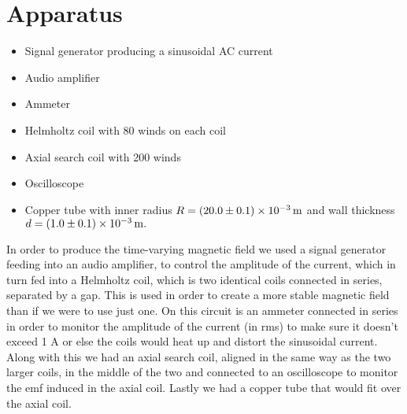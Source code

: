 \documentclass[12pt]{article}
\numberwithin{equation}{section}
\numberwithin{figure}{section}
\begin{document}
    \section{Apparatus}\label{sec:Apparatus}
    \begin{itemize}
        \item Signal generator producing a sinusoidal AC current
        \item Audio amplifier
        \item Ammeter
        \item Helmholtz coil with 80 winds on each coil
        \item Axial search coil with 200 winds
        \item Oscilloscope 
        \item Copper tube with inner radius $R=\SI{20\pm0.1e-3}{\metre}$ and wall thickness 
        $d=\SI{1\pm0.1e-3}{\metre}.$
    \end{itemize}
    In order to produce the time-varying magnetic field we used a signal generator feeding into 
    an audio amplifier, to control the amplitude of the current, which in turn fed into a 
    Helmholtz coil, which is two identical coils connected in series, separated by a gap. This 
    is used in order to create a more stable magnetic field than if we were to use just one. 
    On this circuit is an ammeter connected in series in order to monitor the amplitude of the 
    current (in rms) to make sure it doesn't exceed 1 A or else the coils would heat up and 
    distort the sinusoidal current. \newline
    Along with this we had an axial search coil, aligned in the same way as the two larger coils, 
    in the middle of the two and connected to an oscilloscope to monitor the emf induced in the 
    axial coil. Lastly we had a copper tube that would fit over the axial coil.
\end{document}
